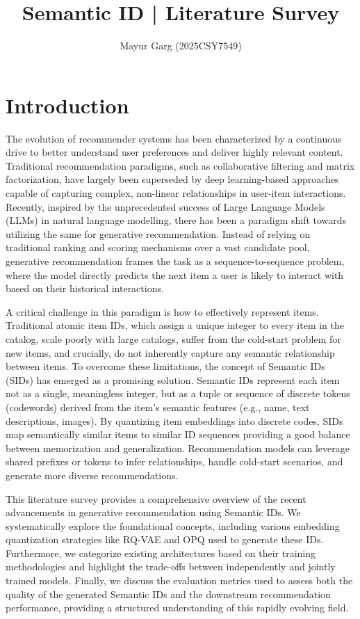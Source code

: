 \documentclass[11pt,a4paper]{article}
\title{Semantic ID | Literature Survey}
\author{Mayur Garg (2025CSY7549)}
\date{}
\begin{document}
 
\maketitle

\section{Introduction}

The evolution of recommender systems has been characterized by a continuous drive to better understand user preferences and deliver highly relevant content. Traditional recommendation paradigms, such as collaborative filtering and matrix factorization, have largely been superseded by deep learning-based approaches capable of capturing complex, non-linear relationships in user-item interactions. Recently, inspired by the unprecedented success of Large Language Models (LLMs) in natural language modelling, there has been a paradigm shift towards utilizing the same for generative recommendation. Instead of relying on traditional ranking and scoring mechanisms over a vast candidate pool, generative recommendation frames the task as a sequence-to-sequence problem, where the model directly predicts the next item a user is likely to interact with based on their historical interactions.

A critical challenge in this paradigm is how to effectively represent items. Traditional atomic item IDs, which assign a unique integer to every item in the catalog, scale poorly with large catalogs, suffer from the cold-start problem for new items, and crucially, do not inherently capture any semantic relationship between items. To overcome these limitations, the concept of Semantic IDs (SIDs) has emerged as a promising solution. Semantic IDs represent each item not as a single, meaningless integer, but as a tuple or sequence of discrete tokens (codewords) derived from the item's semantic features (e.g., name, text descriptions, images). By quantizing item embeddings into discrete codes, SIDs map semantically similar items to similar ID sequences providing a good balance between memorization and generalization. Recommendation models can leverage shared prefixes or tokens to infer relationships, handle cold-start scenarios, and generate more diverse recommendations.

This literature survey provides a comprehensive overview of the recent advancements in generative recommendation using Semantic IDs. We systematically explore the foundational concepts, including various embedding quantization strategies like RQ-VAE and OPQ used to generate these IDs. Furthermore, we categorize existing architectures based on their training methodologies and highlight the trade-offs between independently and jointly trained models. Finally, we discuss the evaluation metrics used to assess both the quality of the generated Semantic IDs and the downstream recommendation performance, providing a structured understanding of this rapidly evolving field.
\end{document}
